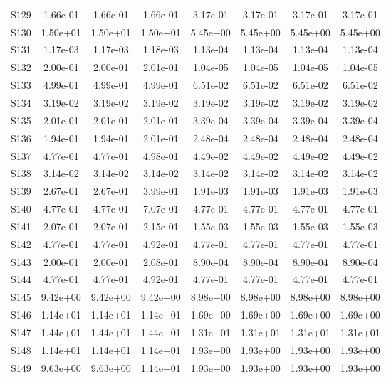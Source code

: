 {\begin{longtable}{l S[table-format=1.2e+2] S[table-format=1.2e+2] S[table-format=1.2e+2] S[table-format=1.2e+2] S[table-format=1.2e+2] S[table-format=1.2e+2] S[table-format=1.2e+2]}
S129 & 1.66e-01 & 1.66e-01 & 1.66e-01 & 3.17e-01 & 3.17e-01 & 3.17e-01 & 3.17e-01 \\
S130 & 1.50e+01 & 1.50e+01 & 1.50e+01 & 5.45e+00 & 5.45e+00 & 5.45e+00 & 5.45e+00 \\
S131 & 1.17e-03 & 1.17e-03 & 1.18e-03 & 1.13e-04 & 1.13e-04 & 1.13e-04 & 1.13e-04 \\
S132 & 2.00e-01 & 2.00e-01 & 2.01e-01 & 1.04e-05 & 1.04e-05 & 1.04e-05 & 1.04e-05 \\
S133 & 4.99e-01 & 4.99e-01 & 4.99e-01 & 6.51e-02 & 6.51e-02 & 6.51e-02 & 6.51e-02 \\
S134 & 3.19e-02 & 3.19e-02 & 3.19e-02 & 3.19e-02 & 3.19e-02 & 3.19e-02 & 3.19e-02 \\
S135 & 2.01e-01 & 2.01e-01 & 2.01e-01 & 3.39e-04 & 3.39e-04 & 3.39e-04 & 3.39e-04 \\
S136 & 1.94e-01 & 1.94e-01 & 2.01e-01 & 2.48e-04 & 2.48e-04 & 2.48e-04 & 2.48e-04 \\
S137 & 4.77e-01 & 4.77e-01 & 4.98e-01 & 4.49e-02 & 4.49e-02 & 4.49e-02 & 4.49e-02 \\
S138 & 3.14e-02 & 3.14e-02 & 3.14e-02 & 3.14e-02 & 3.14e-02 & 3.14e-02 & 3.14e-02 \\
S139 & 2.67e-01 & 2.67e-01 & 3.99e-01 & 1.91e-03 & 1.91e-03 & 1.91e-03 & 1.91e-03 \\
S140 & 4.77e-01 & 4.77e-01 & 7.07e-01 & 4.77e-01 & 4.77e-01 & 4.77e-01 & 4.77e-01 \\
S141 & 2.07e-01 & 2.07e-01 & 2.15e-01 & 1.55e-03 & 1.55e-03 & 1.55e-03 & 1.55e-03 \\
S142 & 4.77e-01 & 4.77e-01 & 4.92e-01 & 4.77e-01 & 4.77e-01 & 4.77e-01 & 4.77e-01 \\
S143 & 2.00e-01 & 2.00e-01 & 2.08e-01 & 8.90e-04 & 8.90e-04 & 8.90e-04 & 8.90e-04 \\
S144 & 4.77e-01 & 4.77e-01 & 4.92e-01 & 4.77e-01 & 4.77e-01 & 4.77e-01 & 4.77e-01 \\
S145 & 9.42e+00 & 9.42e+00 & 9.42e+00 & 8.98e+00 & 8.98e+00 & 8.98e+00 & 8.98e+00 \\
S146 & 1.14e+01 & 1.14e+01 & 1.14e+01 & 1.69e+00 & 1.69e+00 & 1.69e+00 & 1.69e+00 \\
S147 & 1.44e+01 & 1.44e+01 & 1.44e+01 & 1.31e+01 & 1.31e+01 & 1.31e+01 & 1.31e+01 \\
S148 & 1.14e+01 & 1.14e+01 & 1.14e+01 & 1.93e+00 & 1.93e+00 & 1.93e+00 & 1.93e+00 \\
S149 & 9.63e+00 & 9.63e+00 & 1.14e+01 & 1.93e+00 & 1.93e+00 & 1.93e+00 & 1.93e+00 \\

\end{longtable}}
